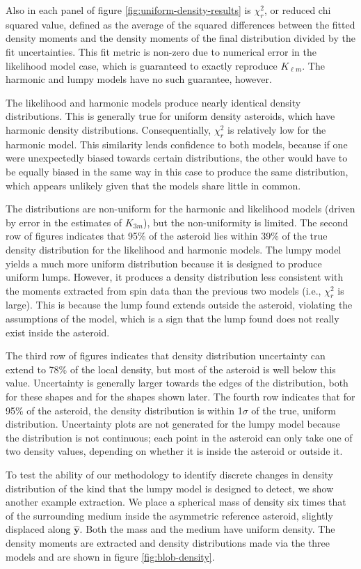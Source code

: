 \documentclass[fleqn,usenatbib]{mnras}
\newcommand{\unit}[1]{\bm{\hat{#1}}}
\begin{document}
Also in each panel of figure \ref{fig:uniform-density-results} is $\chi^2_r$, or reduced chi squared value, defined as the average of the squared differences between the fitted density moments and the density moments of the final distribution divided by the fit uncertainties. This fit metric is non-zero due to numerical error in the likelihood model case, which is guaranteed to exactly reproduce $K_{\ell m}$. The harmonic and lumpy models have no such guarantee, however.

The likelihood and harmonic models produce nearly identical density distributions. This is generally true for uniform density asteroids, which have harmonic density distributions. Consequentially, $\chi^2_r$ is relatively low for the harmonic model. This similarity lends confidence to both models, because if one were unexpectedly biased towards certain distributions, the other would have to be equally biased in the same way in this case to produce the same distribution, which appears unlikely given that the models share little in common.

The distributions are non-uniform for the harmonic and likelihood models (driven by error in the estimates of $K_{3m}$), but the non-uniformity is limited. The second row of figures indicates that 95\% of the asteroid lies within 39\% of the true density distribution for the likelihood and harmonic models. The lumpy model yields a much more uniform distribution because it is designed to produce uniform lumps. However, it produces a density distribution less consistent with the moments extracted from spin data than the previous two models (i.e., $\chi^2_r$ is large). This is because the lump found extends outside the asteroid, violating the assumptions of the model, which is a sign that the lump found does not really exist inside the asteroid.

The third row of figures indicates that density distribution uncertainty  can extend to 78\% of the local density, but most of the asteroid is well below this value. Uncertainty is generally larger towards the edges of the distribution, both for these shapes and for the shapes shown later. The fourth row indicates that for 95\% of the asteroid, the density distribution is within 1$\sigma$ of the true, uniform distribution. Uncertainty plots are not generated for the lumpy model because the distribution is not continuous; each point in the asteroid can only take one of two density values, depending on whether it is inside the asteroid or outside it.

To test the ability of our methodology to identify discrete changes in density distribution of the kind that the lumpy model is designed to detect, we show another example extraction. We place a spherical mass of density six times that of the surrounding medium inside the asymmetric reference asteroid, slightly displaced along $\unit y$. Both the mass and the medium have uniform density. The density moments are extracted and density distributions made via the three models and are shown in figure \ref{fig:blob-density}.
\end{document}
